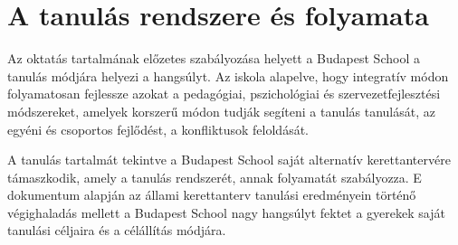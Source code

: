 \section{A tanulás rendszere és folyamata}
Az oktatás tartalmának előzetes szabályozása helyett a Budapest School a tanulás módjára helyezi a hangsúlyt. Az iskola alapelve, hogy integratív módon folyamatosan fejlessze azokat a pedagógiai, pszichológiai és szervezetfejlesztési módszereket, amelyek korszerű módon tudják segíteni a tanulás tanulását, az egyéni és csoportos fejlődést, a konfliktusok feloldását.

A tanulás tartalmát tekintve a Budapest School saját alternatív kerettantervére támaszkodik, amely a tanulás rendszerét, annak folyamatát szabályozza. E dokumentum alapján az állami kerettanterv tanulási eredményein történő végighaladás mellett a Budapest School nagy hangsúlyt fektet a gyerekek saját tanulási céljaira és a célállítás módjára.

